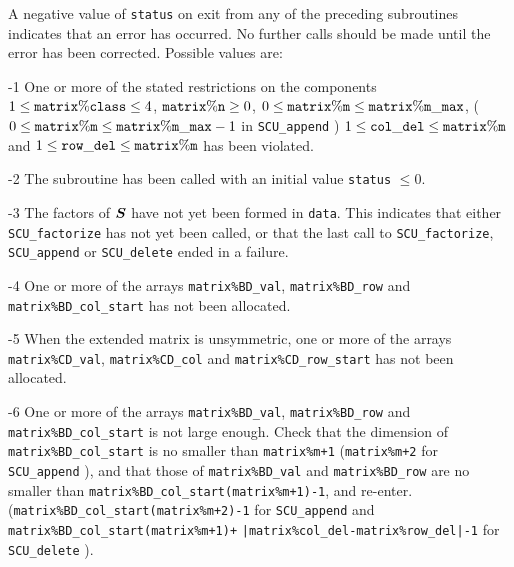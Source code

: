 \documentclass{galahad}
\newcommand{\packagename}{SCU}
\begin{document}

\galerrors
A negative value of {\tt status} on exit from any of the preceding subroutines
indicates that an error has occurred. No further calls should be made
until the error has been corrected. Possible values are:

\begin{description}

\item{-1} One or more of the stated restrictions on the components 
$1 \leq  {\tt  matrix\%class} \leq 4$, 
${\tt matrix\%n} \geq 0$,
$0 \leq {\tt matrix\%m} \\ \leq {\tt matrix\%m\_max}$,
($0 \leq {\tt matrix\%m} \leq {\tt matrix\%m\_max}-1$ in 
{\tt \packagename\_append} ) 
$1 \leq {\tt col\_del} \leq {\tt matrix\%m}$ and 
$1 \leq {\tt row\_del} \leq {\tt matrix\%m}$
has been violated.  

\item{-2} The subroutine has been called with an initial value {\tt status} 
$\leq 0$. 

\item{-3} The factors of ${\bm{S}}$ have not yet been formed in {\tt data}. 
This indicates that either  
{\tt \packagename\_factorize} has not yet been called, or that the last call to 
{\tt \packagename\_factorize}, {\tt \packagename\_append} or 
{\tt \packagename\_delete} 
ended in a failure.  

\item{-4} One or more of the arrays {\tt matrix\%BD\_val}, 
{\tt matrix\%BD\_row} and 
{\tt matrix\%BD\_col\_start} has not been allocated. 

\item{-5} When the extended matrix is unsymmetric, one or more of the arrays  
{\tt matrix\%CD\_val}, {\tt matrix\%CD\_col} and 
{\tt matrix\%CD\_row\_start} has not been allocated. 

\item{-6} One or more of the arrays {\tt matrix\%BD\_val}, 
{\tt matrix\%BD\_row} and 
{\tt matrix\%BD\_col\_start} is not large enough. Check that the dimension 
of {\tt matrix\%BD\_col\_start} is no smaller than  
{\tt matrix\%m+1} 
({\tt matrix\%m+2} for {\tt \packagename\_a\-pp\-end} ), 
and that those of  
{\tt matrix\%BD\_val} and {\tt matrix\%BD\_row} are no smaller than 
{\tt matrix\%BD\_col\_start(mat\-rix\%m+1)-1}, and re-enter. 
({\tt matrix\%BD\_col\_start(matrix\%m+2)-1} for {\tt \packagename\_append} 
and {\tt matrix\%BD\_col\_st\-art(matrix\%m+1)+} 
{\tt |matrix\%col\_del-matrix\%row\_del|-1} for {\tt \packagename\_delete} ). 


\end{description}
\end{document}
